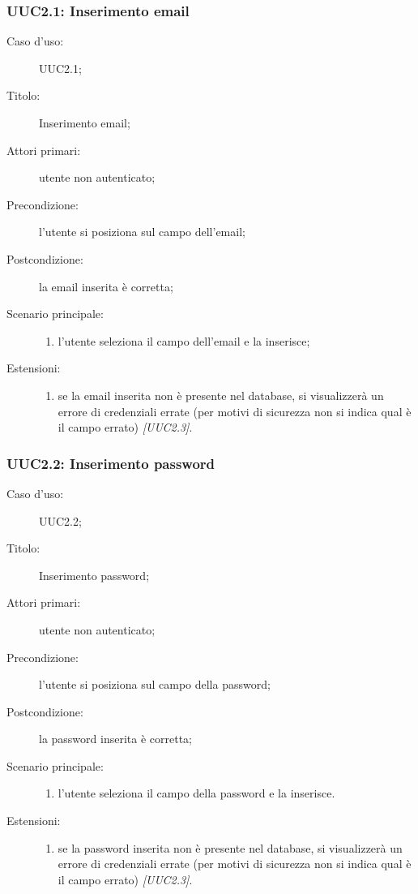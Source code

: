 \documentclass[../../../analisi-dei-requisiti.tex]{subfiles}
\begin{document}
\subsubsection{UUC2.1: Inserimento email}%
\label{subs:UUC2.1}
\begin{description}
  \item[Caso d’uso:] UUC2.1;
  \item[Titolo:] Inserimento email;
  \item[Attori primari:] utente non autenticato;
  \item[Precondizione:] l'utente si posiziona sul campo dell'email;
  \item[Postcondizione:] la email inserita è corretta;
  \item[Scenario principale:]
  \begin{enumerate}
    \item l'utente seleziona il campo dell'email e la inserisce;
  \end{enumerate}
  \item[Estensioni:]
  \begin{enumerate}
    \item se la email inserita non è presente nel database, si visualizzerà un errore di credenziali errate (per motivi di sicurezza non si indica qual è il campo errato) \emph{[UUC2.3]}.
  \end{enumerate}
\end{description}



\subsubsection{UUC2.2: Inserimento password}%
\label{subs:UUC2.2}
\begin{description}
  \item[Caso d’uso:] UUC2.2;
  \item[Titolo:] Inserimento password;
  \item[Attori primari:] utente non autenticato;
  \item[Precondizione:] l'utente si posiziona sul campo della password;
  \item[Postcondizione:] la password inserita è corretta;
  \item[Scenario principale:]
  \begin{enumerate}
    \item l'utente seleziona il campo della password e la inserisce.
  \end{enumerate}
  \item[Estensioni:]
  \begin{enumerate}
    \item se la password inserita non è presente nel database, si visualizzerà un errore di credenziali errate (per motivi di sicurezza non si indica qual è il campo errato) \emph{[UUC2.3]}.
  \end{enumerate}
\end{description}
\end{document}
